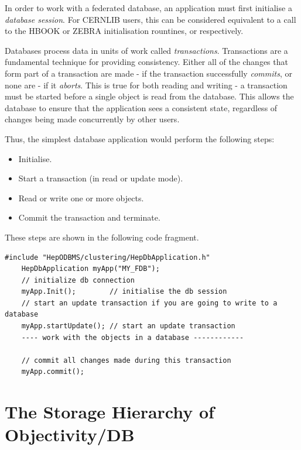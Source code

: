 In order to work with a federated database, an application must first
initialise a \emph{database session}. For CERNLIB users, this
can be considered equivalent to a call to the HBOOK or ZEBRA
initialisation rountines,  or 
respectively.

\par

Databases process data in units of work called \emph{transactions}. Transactions
are a fundamental technique for providing consistency. Either all of the changes that
form part of a transaction are made - if the transaction successfully \emph{commits},
or none are - if it \emph{aborts}. This is true for both reading and writing - a
transaction must be started before a single object is read from the database. This
allows the database to ensure that the application sees a consistent state, regardless
of changes being made concurrently by other users.

\par

Thus, the simplest database application would perform the following steps:

\begin{itemize}

\item Initialise.
\item Start a transaction (in read or update mode).
\item Read or write one or more objects.
\item Commit the transaction and terminate.\end{itemize}

\par

These steps are shown in the following code fragment.
\begin{verbatim}
#include "HepODBMS/clustering/HepDbApplication.h"
    HepDbApplication myApp("MY_FDB"); 
    // initialize db connection 
    myApp.Init();        // initialise the db session 
    // start an update transaction if you are going to write to a database 
    myApp.startUpdate(); // start an update transaction 
    ---- work with the objects in a database ------------ 

    // commit all changes made during this transaction 
    myApp.commit(); 

\end{verbatim}
\section{The Storage Hierarchy of Objectivity/DB}

